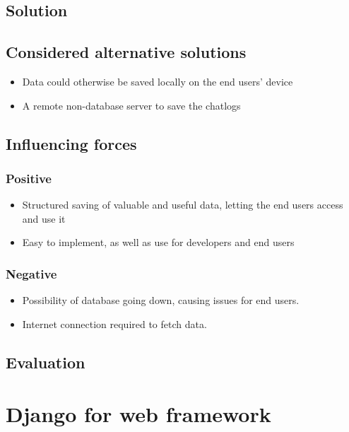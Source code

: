 \documentclass[12pt, a4paper]{article}
\begin{document}
\subsection{Solution}

\subsection{Considered alternative solutions}
\begin{itemize}
    \item Data could otherwise be saved locally on the end users' device
    \item A remote non-database server to save the chatlogs
\end{itemize}
\subsection{Influencing forces}
\begin{minipage}{0.5\textwidth}
    \subsubsection*{Positive}
    \begin{itemize}
        \item Structured saving of valuable and useful data, letting the end users access and use it
        \item Easy to implement, as well as use for developers and end users
    \end{itemize}
\end{minipage}%
\begin{minipage}{0.5\textwidth}
    \subsubsection*{Negative}
    \begin{itemize}
        \item Possibility of database going down, causing issues for end users.
        \item Internet connection required to fetch data.
    \end{itemize}
\end{minipage}

\subsection{Evaluation}

\newpage
\section{Django for web framework}
\end{document}
